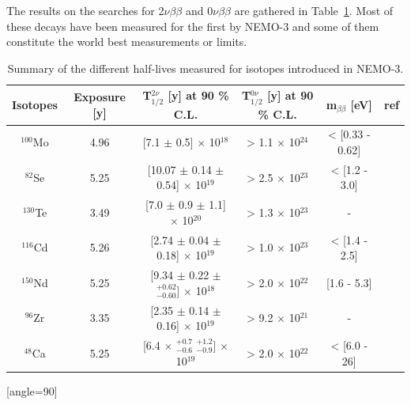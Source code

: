 \documentclass[main.tex]{subfiles}
\begin{document}
\bigskip


\NI  The results on the searches for 2$\nu\beta\beta$ and 0$\nu\beta\beta$ are gathered in Table~\ref{tab:SummaryDecayRateNEMO3}. Most of these decays have been measured for the first by NEMO-3 and some of them constitute the world best measurements or limits. 


\bigskip


\begin{table}[h!]
\centering
\begin{turn}{90}
\begin{tabular}{c|c|c|c|c|c}

Isotopes & Exposure [y] & T$_{\text{1/2}}^{\text{2}\nu}$ [y] at 90 \% C.L. & T$_{\text{1/2}}^{\text{0}\nu}$ [y] at 90 \% C.L. & m$_{\beta\beta}$ [eV] & ref\\

\toprule

$^{\text{100}}$Mo  & 4.96 & [7.1 $\pm$ 0.5] $\times$ 10$^{\text{18}}$ & > 1.1 $\times$ 10$^{\text{24}}$ & < [0.33 - 0.62] & \cite{NEMO3:Mo100} \\[0.1cm]

$^{\text{82}}$Se  & 5.25 & [10.07 $\pm$ 0.14 $\pm$ 0.54] $\times$ 10$^{\text{19}}$ & > 2.5 $\times$ 10$^{\text{23}}$  & < [1.2 - 3.0] &\cite{NEMO3:Se82}  \\[0.1cm]

$^{\text{130}}$Te & 3.49 &[7.0 $\pm$ 0.9 $\pm$ 1.1] $\times$ 10$^{\text{20}}$ & > 1.3 $\times$ 10$^{\text{23}}$  & - & \cite{NEMO3:Te130}\\[0.1cm]

$^{\text{116}}$Cd & 5.26 &[2.74 $\pm$ 0.04 $\pm$ 0.18] $\times$ 10$^{\text{19}}$ & > 1.0 $\times$ 10$^{\text{23}}$  & < [1.4 - 2.5] &\cite{Arnold2016bed} \\[0.1cm]

$^{\text{150}}$Nd & 5.25 &[9.34 $\pm$ 0.22 $\pm$ $^{+\text{0.62}}_{-\text{0.60}}$] $\times$ 10$^{\text{18}}$ & > 2.0 $\times$ 10$^{\text{22}}$  & [1.6 - 5.3] & \cite{NEMO3:Nd150}\\[0.1cm]

$^{\text{96}}$Zr  & 3.35 & [2.35 $\pm$ 0.14 $\pm$ 0.16] $\times$ 10$^{\text{19}}$ & > 9.2 $\times$ 10$^{\text{21}}$  & - & \cite{NEMO3:Zr96}\\[0.1cm]

$^{\text{48}}$Ca  & 5.25 &[6.4 $\times$ $^{+\text{0.7}}_{-\text{0.6}}$ $^{+\text{1.2}}_{-\text{0.9}}$] $\times$ 10$^{\text{19}}$ & > 2.0 $\times$ 10$^{\text{22}}$  & < [6.0 - 26] & \cite{NEMO3:Ca48}\\[0.1cm]

\bottomrule
\end{tabular}
\end{turn}
\caption{Summary of the different half-lives measured for isotopes introduced in NEMO-3.}[angle=90]
\label{tab:SummaryDecayRateNEMO3}

\end{table}
\end{document}
